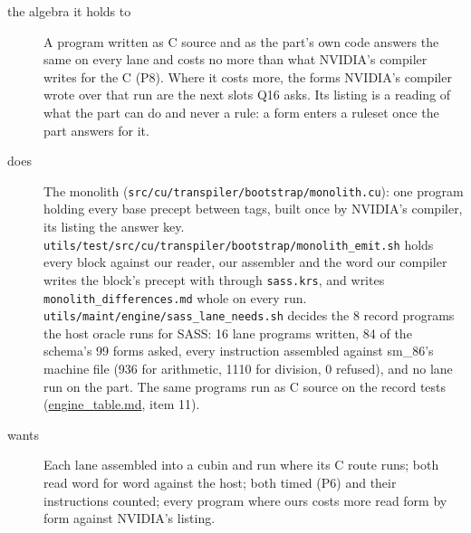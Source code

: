 \begin{description}
\item[{the algebra it holds to}] A program written as C source and as the part's own code answers the same on every lane and costs no more than what NVIDIA's compiler writes for the C (P8). Where it costs more, the forms NVIDIA's compiler wrote over that run are the next slots Q16 asks. Its listing is a reading of what the part can do and never a rule: a form enters a ruleset once the part answers for it.
\item[{does}] The monolith (\texttt{src/\allowbreak{}cu/\allowbreak{}transpiler/\allowbreak{}bootstrap/\allowbreak{}monolith.\allowbreak{}cu}): one program holding every base precept between tags, built once by NVIDIA's compiler, its listing the answer key. \texttt{utils/\allowbreak{}test/\allowbreak{}src/\allowbreak{}cu/\allowbreak{}transpiler/\allowbreak{}bootstrap/\allowbreak{}monolith\_\allowbreak{}emit.\allowbreak{}sh} holds every block against our reader, our assembler and the word our compiler writes the block's precept with through \texttt{sass.\allowbreak{}krs}, and writes \texttt{monolith\_\allowbreak{}differences.\allowbreak{}md} whole on every run. \texttt{utils/\allowbreak{}maint/\allowbreak{}engine/\allowbreak{}sass\_\allowbreak{}lane\_\allowbreak{}needs.\allowbreak{}sh} decides the 8 record programs the host oracle runs for SASS: 16 lane programs written, 84 of the schema's 99 forms asked, every instruction assembled against sm\_\allowbreak{}86's machine file (936 for arithmetic, 1110 for division, 0 refused), and no lane run on the part. The same programs run as C source on the record tests (\hyperref[chap:engine-table]{engine\_\allowbreak{}table.md}, item 11).
\item[{wants}] Each lane assembled into a cubin and run where its C route runs; both read word for word against the host; both timed (P6) and their instructions counted; every program where ours costs more read form by form against NVIDIA's listing.

\end{description}
